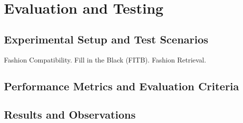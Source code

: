 \chapter{Evaluation and Testing}
\section{Experimental Setup and Test Scenarios}

Fashion Compatibility.
Fill in the Black (FITB).
Fashion Retrieval.


\section{Performance Metrics and Evaluation Criteria}
\section{Results and Observations}
